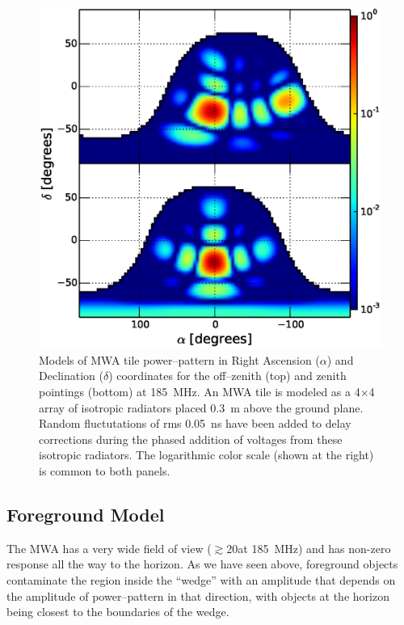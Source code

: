 \documentclass[preprint2,iop,numberedappendix]{emulateapj}
\begin{document}
\begin{figure}[htb]
\centering
\includegraphics[width=\linewidth]{figures/v1_0/delta_array_powerpattern_0.3m_ground_custom.eps}
\caption{Models of MWA tile power--pattern in Right Ascension ($\alpha$) and Declination ($\delta$) coordinates for the off--zenith (top) and zenith pointings (bottom) at 185~MHz. An MWA tile is modeled as a 4$\times$4 array of isotropic radiators placed 0.3~m above the ground plane. Random fluctutations of rms 0.05~ns have been added to delay corrections during the phased addition of voltages from these isotropic radiators. The logarithmic color scale (shown at the right) is common to both panels. \label{fig:power_pattern}}
\end{figure}

\subsection{Foreground Model}\label{sec:foreground}

The MWA has a very wide field of view ($\gtrsim 20$\arcdeg at 185~MHz) and has non-zero response all the way to the horizon. As we have seen above, foreground objects contaminate the region inside the ``wedge'' with an amplitude that depends on the amplitude of power--pattern in that direction, with objects at the horizon being closest to the boundaries of the wedge. 
\end{document}
